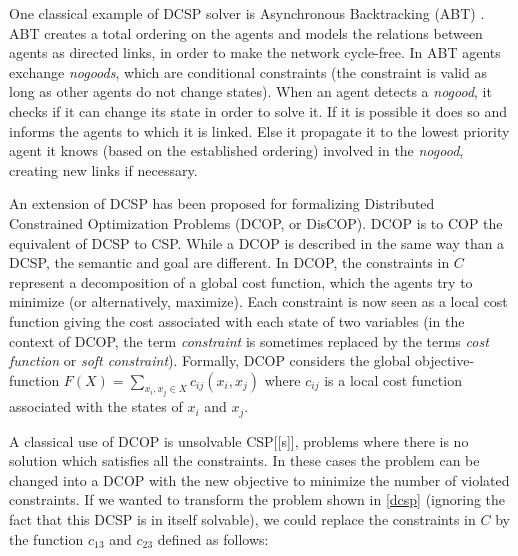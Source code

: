 One classical example of DCSP solver is Asynchronous Backtracking (ABT) \cite{Yokoo:2001:DCS:380145}. ABT creates a total ordering on the agents and models the relations between agents as directed links, in order to make the network cycle-free. In ABT agents exchange \emph{nogoods}, which are conditional constraints (the constraint is valid as long as other agents do not change states). When an agent detects a \emph{nogood}, it checks if it can change its state in order to solve it. If it is possible it does so and informs the agents to which it is linked. Else it propagate it to the lowest priority agent it knows (based on the established ordering) involved in the \emph{nogood}, creating new links if necessary.

An extension of DCSP has been proposed for formalizing Distributed Constrained Optimization Problems (DCOP, or DisCOP). DCOP is to COP the equivalent of DCSP to CSP. While a DCOP is described in the same way than a DCSP, the semantic and goal are different.
In DCOP, the constraints in $C$ represent a decomposition of a global cost function, which the agents try to minimize (or alternatively, maximize). Each constraint is now seen as a local cost function giving the cost associated with each state of two variables (in the context of DCOP, the term \emph{constraint} is sometimes replaced by the terms \emph{cost function} or \emph{soft constraint}). Formally, DCOP considers the global objective-function $F(X) = \displaystyle\sum_{x_i, x_j \in X} c_{ij}(x_i,x_j)$ where $c_{ij}$ is a local cost function associated with the states of $x_i$ and $x_j$.

A classical use of DCOP is unsolvable CSP[[s]], problems where there is no solution which satisfies all the constraints. In these cases the problem can be changed into a DCOP with the new objective to minimize the number of violated constraints. If we wanted to transform the problem shown in \figurename{} \ref{dcsp} (ignoring the fact that this DCSP is in itself solvable), we could replace the constraints in $C$ by the function $c_{13}$ and $c_{23}$ defined as follows:

